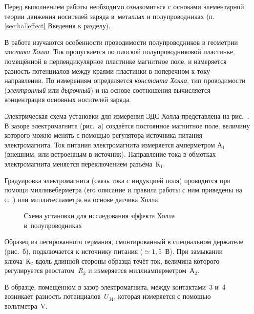 


Перед выполнением работы необходимо ознакомиться с основами
элементарной теории движения носителей заряда в~металлах и полупроводниках
(п. \ref{sec:halleffect} Введения к разделу).

В работе изучаются особенности проводимости полупроводников
в геометрии \emph{мостика Холла}.
Ток пропускается по плоской полупроводниковой пластинке, 
помещённой в перпендикулярное пластинке магнитное поле,
и измеряется разность потенциалов между краями пластинки в поперечном
к току направлении. По измерениям определяется \emph{константа Холла},
тип проводимости (\emph{электронный} или \emph{дырочный}) и на основе
соотношения  вычисляется концентрация основных
носителей заряда.

\experiment
Электрическая схема установки для измерения ЭДС Холла представлена
на рис.~. В зазоре электромагнита (рис.~а) 
создаётся постоянное магнитное поле, величину которого можно менять с помощью 
регулятора источника питания электромагнита. Ток питания электромагнита 
измеряется амперметром А$_1$ (внешним, или встроенным в источник).
Направление тока в обмотках электромагнита меняется переключением
разъёма~К$_1$.

Градуировка электромагнита (связь тока с индукцией поля) проводится 
при помощи милливеберметра (его описание и правила работы 
с ним приведены на с.~\pageref{MWB}) или миллитесламетра на основе
датчика Холла.

\begin{figure}[h]
    \centering
	\caption{Схема установки для исследования эффекта Холла в~полупроводниках}
\end{figure}

Образец из легированного германия, смонтированный в специальном держателе
(рис.~б), подключается к источнику питания ($\simeq 1,5$~В). При
замыкании ключа~К$_2$ вдоль длинной стороны образца течёт ток, величина которого
регулируется реостатом~$R_2$ и измеряется миллиамперметром~А$_2$.

В образце, помещённом в зазор электромагнита, между 
контактами~3 и~4 возникает разность потенциалов~$U_{34}$, 
которая измеряется с помощью вольтметра~V.

